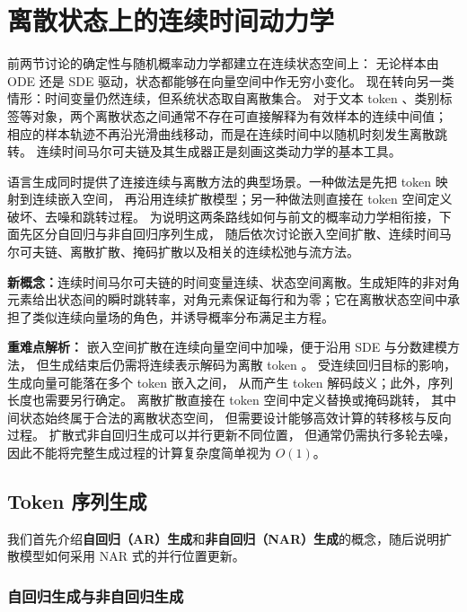 \section{离散状态上的连续时间动力学}
\label{sec:diffusion-models-in-language}

前两节讨论的确定性与随机概率动力学都建立在连续状态空间上：
无论样本由 ODE 还是 SDE 驱动，状态都能够在向量空间中作无穷小变化。
现在转向另一类情形：时间变量仍然连续，但系统状态取自离散集合。
对于文本 token 、类别标签等对象，两个离散状态之间通常不存在可直接解释为有效样本的连续中间值；
相应的样本轨迹不再沿光滑曲线移动，而是在连续时间中以随机时刻发生离散跳转。
连续时间马尔可夫链及其生成器正是刻画这类动力学的基本工具。

语言生成同时提供了连接连续与离散方法的典型场景。一种做法是先把 token 映射到连续嵌入空间，
再沿用连续扩散模型；另一种做法则直接在 token 空间定义破坏、去噪和跳转过程。
为说明这两条路线如何与前文的概率动力学相衔接，下面先区分自回归与非自回归序列生成，
随后依次讨论嵌入空间扩散、连续时间马尔可夫链、离散扩散、掩码扩散以及相关的连续松弛与流方法。

\begin{importantnote}
\textbf{新概念：}连续时间马尔可夫链的时间变量连续、状态空间离散。生成矩阵的非对角元素给出状态间的瞬时跳转率，对角元素保证每行和为零；它在离散状态空间中承担了类似连续向量场的角色，并诱导概率分布满足主方程。

\textbf{重难点解析：}
嵌入空间扩散在连续向量空间中加噪，便于沿用 SDE 与分数建模方法，
但生成结束后仍需将连续表示解码为离散 token 。
受连续回归目标的影响，生成向量可能落在多个 token 嵌入之间，
从而产生 token 解码歧义；此外，序列长度也需要另行确定。
离散扩散直接在 token 空间中定义替换或掩码跳转，
其中间状态始终属于合法的离散状态空间，
但需要设计能够高效计算的转移核与反向过程。
扩散式非自回归生成可以并行更新不同位置，
但通常仍需执行多轮去噪，因此不能将完整生成过程的计算复杂度简单视为 \(O(1)\)。
\end{importantnote}

\subsection{Token 序列生成}

我们首先介绍\textbf{自回归（AR）生成}和\textbf{非自回归（NAR）生成}的概念，随后说明扩散模型如何采用 NAR 式的并行位置更新。
\subsubsection{自回归生成与非自回归生成}

